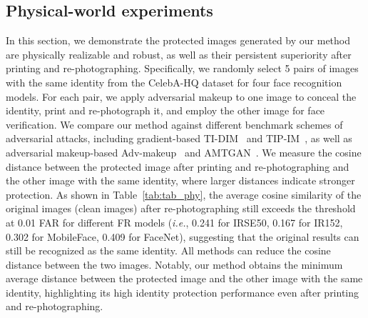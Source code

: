 \documentclass[10pt,journal,compsoc]{IEEEtran}
\begin{document}
\subsection{Physical-world experiments}
In this section, we demonstrate the protected images generated by our method are physically realizable and robust, as well as their persistent superiority after printing and re-photographing. Specifically, we randomly select 5 pairs of images with the same identity from the CelebA-HQ dataset for four face recognition models. For each pair, we apply adversarial makeup to one image to conceal the identity, print and re-photograph it, and employ the other image for face verification. We compare our method against different benchmark schemes of adversarial attacks, including gradient-based TI-DIM~\cite{dong2019evading} and TIP-IM~\cite{yang2021towards}, as well as adversarial makeup-based Adv-makeup~\cite{yin2021adv} and AMTGAN~\cite{hu2022protecting}. We measure the cosine distance between the protected image after printing and re-photographing and the other image with the same identity, where larger distances indicate stronger protection.
As shown in Table~\ref{tab:tab_phy}, the average cosine similarity of the original images (clean images) after re-photographing still exceeds the threshold at 0.01 FAR for different FR models (\emph{i.e.}, 0.241 for IRSE50, 0.167 for IR152, 0.302 for MobileFace, 0.409 for FaceNet), suggesting that the original results can still be recognized as the same identity. All methods can reduce the cosine distance between the two images. Notably, our method obtains the minimum average distance between the protected image and the other image with the same identity, highlighting its high identity protection performance even after printing and re-photographing.
 
\end{document}
